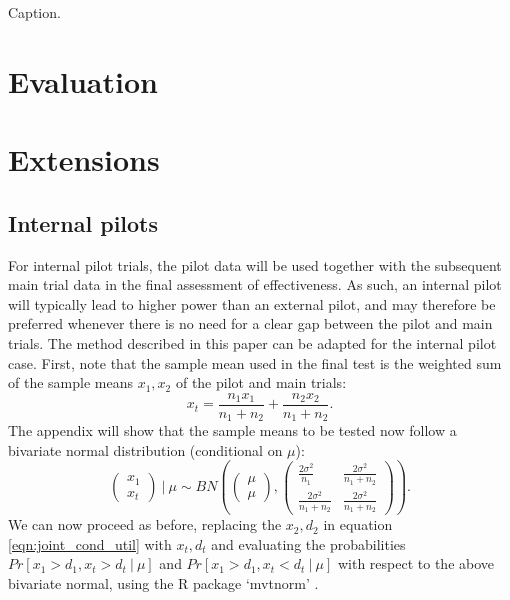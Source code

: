 \documentclass[sagev]{sagej}
\begin{document}
\begin{table}
\small\sf\centering
\caption{Caption.}

\label{tab:ill}
\end{table}





\section{Evaluation}







\section{Extensions}

\subsection{Internal pilots}

For internal pilot trials, the pilot data will be used together with the subsequent main trial data in the final assessment of effectiveness. As such, an internal pilot will typically lead to higher power than an external pilot, and may therefore be preferred whenever there is no need for a clear gap between the pilot and main trials. The method described in this paper can be adapted for the internal pilot case. First, note that the sample mean used in the final test is the weighted sum of the sample means $x_1, x_2$ of the pilot and main trials:
$$
x_t = \frac{n_1 x_1}{n_1 + n_2} + \frac{n_2 x_2}{n_1 + n_2}.
$$
The appendix will show that the sample means to be tested now follow a bivariate normal distribution (conditional on $\mu$):
$$
\begin{pmatrix}
x_1 \\
x_t
\end{pmatrix} ~|~ \mu
\sim BN\left( 
\begin{pmatrix}
\mu \\
\mu
\end{pmatrix},
\begin{pmatrix}
\frac{2\sigma^2}{n_1} & \frac{2\sigma^2}{n_1 + n_2} \\
\frac{2\sigma^2}{n_1 + n_2} & \frac{2\sigma^2}{n_1 + n_2}
\end{pmatrix} \right).
$$
We can now proceed as before, replacing the $x_2, d_2$ in equation \ref{eqn:joint_cond_util} with $x_t, d_t$ and evaluating the probabilities $Pr[x_1>d_1, x_t>d_t ~|~ \mu]$ and $Pr[x_1>d_1, x_t<d_t  ~|~ \mu]$ with respect to the above bivariate normal, using the R package `mvtnorm' \cite{Genz2017}.  
\end{document}
